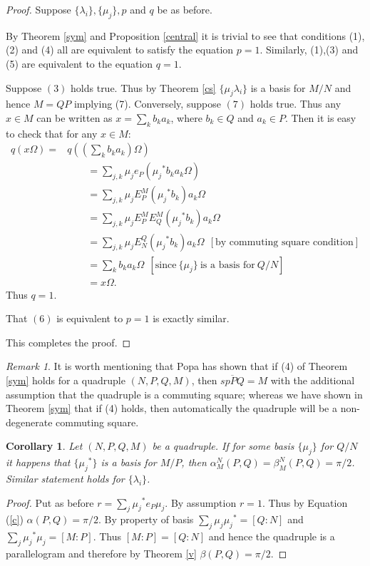 \documentclass[11pt,letterpaper]{amsart}
\newtheorem{corollary}[theorem]{Corollary}
\theoremstyle{definition}
\theoremstyle{remark}
\newtheorem{remark}[theorem]{Remark}
\begin{document}
\begin{proof}
Suppose $\{\lambda_i\}, \{\mu_j\},p$ and $q$ be as before.


By Theorem \ref{sym} and Proposition \ref{central} it is trivial to see that conditions (1), (2) and (4) all are 
equivalent to satisfy the equation  $p=1$. Similarly, (1),(3) and (5) are equivalent to the equation $q=1$. 



Suppose $(3)$ holds true. Thus by Theorem \ref{cs} $\{\mu_j \lambda_i\}$ is a basis for $M/N$ and hence $M=QP$ implying (7). Conversely, suppose $(7)$ holds true. Thus  any $x\in M$ can be written as $x= \sum_k b_k a_k$, where $b_k\in Q$ and $a_k\in P$.
Then  it is easy to check that for any $x\in M$:
\begin{align*}
 q(x\Omega) = & q((\sum_k b_k a_k)\Omega)\\
 & \qquad = \sum_{j,k} \mu_j e_P({\mu_j}^*b_k a_k\Omega)\\
 & \qquad= \sum_{j,k} \mu_j E^M_P({\mu_j}^*b_k)a_k\Omega\\
 & \qquad= \sum_{j,k} \mu_j E^M_P E^M_Q({\mu_j}^*b_k)a_k\Omega\\
 & \qquad= \sum_{j,k} \mu_j E^Q_N({\mu_j}^*b_k)a_k\Omega~ ~[\textrm{by commuting square condition}]\\
 & \qquad= \sum_{k} b_k a_k \Omega~~ [\textrm{since}~\{\mu_j\} ~\textrm{is a basis for}~ Q/N]\\
 &\qquad= x\Omega.
\end{align*}
Thus $q=1$.  

That $(6)$ is equivalent to $ p=1$ is exactly similar.

This completes the proof.
\end{proof}


\begin{remark}
 It is worth mentioning that Popa has shown  that if (4) of Theorem \ref{sym} holds for a quadruple $(N,P,Q,M)$, then $\overline{sp PQ}=M$ with the additional 
 assumption that the quadruple is a commuting square; whereas we have shown in Theorem \ref{sym} that if (4) holds, then automatically the quadruple will be a non-degenerate commuting square.
\end{remark}

\begin{corollary}
 Let $(N,P,Q,M)$ be a quadruple. If for some basis $\{\mu_j\}$  for $Q/N$ it happens that  $\{{\mu_j}^*\}$
 is  a basis for $M/P$, then $\alpha^N_M(P,Q)= \beta^N_M(P,Q)= \pi/2$. Similar statement holds for $\{\lambda_i\}$.
\end{corollary}
\begin{proof}
 Put as before $r= \sum_j{\mu_j}^* e_P \mu_j$. By assumption $r=1$. Thus by Equation (\ref{c}) $\alpha(P,Q)= \pi/2$. By property of 
 basis $\sum_j \mu_j {\mu_j}^*= [Q:N]$ and $\sum_j {\mu_j}^* \mu_j= [M:P]$. Thus $[M:P]=[Q:N]$ and hence the quadruple is a parallelogram and therefore by Theorem \ref{v} $\beta(P,Q)= \pi/2$.
\end{proof}
\end{document}
